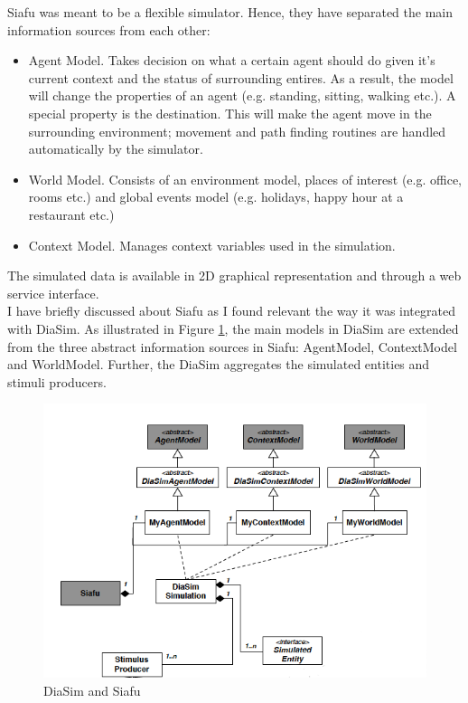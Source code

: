 Siafu was meant to be a flexible simulator. Hence, they have separated the main information sources from each other:
\begin{itemize}
	\item Agent Model. Takes decision on what a certain agent should do given it's current context and the status of surrounding entires. As a result, the model will change the properties of an agent (e.g. standing, sitting, walking etc.). A special property is the destination. This will make the agent move in the surrounding environment; movement and path finding routines are handled automatically by the simulator.
	\item World Model. Consists of an environment model, places of interest (e.g. office, rooms etc.) and global events model (e.g. holidays, happy hour at a restaurant etc.)
	\item Context Model. Manages context variables used in the simulation.
\end{itemize}

The simulated data is available in 2D graphical representation and through a web service interface.\\

I have briefly discussed about Siafu as I found relevant the way it was integrated with DiaSim. As illustrated in Figure \ref{fig:diasim_and_siafu}, the main models in DiaSim are extended from the three abstract information sources in Siafu: AgentModel, ContextModel and WorldModel. Further, the DiaSim aggregates the simulated entities and stimuli producers.

\begin{figure}[H]
	\centering
	\includegraphics[width=\linewidth]{gfx/Chapter2/diasim_and_siafu}
	\caption{DiaSim and Siafu}
	\label{fig:diasim_and_siafu}
\end{figure}

